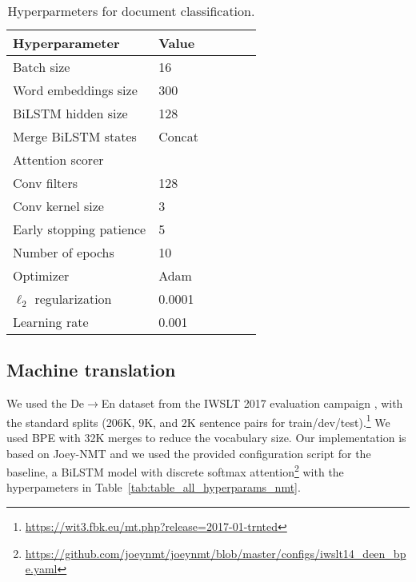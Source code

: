 \documentclass{article}
\begin{document}
\begin{table}[t]
    \caption{Hyperparmeters for document classification.}
    \label{tab:table_all_hyperparams}
    \begin{small}
    \begin{center}
    \begin{tabular}{llllll}
        \toprule
        \sc Hyperparameter & \sc Value  \\
        \midrule
        Batch size                  & 16    \\
        Word embeddings size        & 300     \\
        BiLSTM hidden size          & 128     \\
        Merge BiLSTM states         & Concat     \\
        Attention scorer            & \citep{bahdanau2014neural}     \\
        Conv filters                & 128   \\
        Conv kernel size            & 3     \\
        Early stopping patience     & 5     \\
        Number of epochs            & 10     \\
        Optimizer                   & Adam      \\
        $\ell_2$ regularization     & 0.0001     \\
        Learning rate               & 0.001     \\
        \bottomrule
    \end{tabular}
    \end{center}
    \end{small}
    \vskip -0.1in
\end{table}

\subsection{Machine translation}

We used the De$\to$En dataset from the IWSLT 2017 evaluation campaign \citep{cettolo2017overview}, with the standard splits (206K, 9K, and 2K sentence pairs for train/dev/test).\footnote{\url{https://wit3.fbk.eu/mt.php?release=2017-01-trnted}} We used BPE \citep{sennrich2016neural} with 32K merges to reduce the vocabulary size.
Our implementation is based on Joey-NMT \citep{kreutzer2019joey} and we used the provided configuration script for the baseline, a BiLSTM model with discrete softmax attention\footnote{\url{https://github.com/joeynmt/joeynmt/blob/master/configs/iwslt14_deen_bpe.yaml}} with the  hyperpameters in Table~\ref{tab:table_all_hyperparams_nmt}. 
\end{document}
